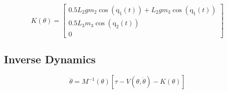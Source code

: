 $$
K(\theta) = \left[\begin{matrix}0.5 L_{2} g m_{2} \cos{\left (\operatorname{q_{1}}{\left (t \right )} \right )} + L_{2} g m_{3} \cos{\left (\operatorname{q_{1}}{\left (t \right )} \right )}\\0.5 L_{3} m_{3} \cos{\left (\operatorname{q_{2}}{\left (t \right )} \right )}\\0\end{matrix}\right]
$$

\subsection*{Inverse Dynamics}

$$
\ddot{\theta} = M^{-1}(\theta) [ \tau -V(\theta, \dot{\theta})- K(\theta) ]
$$
